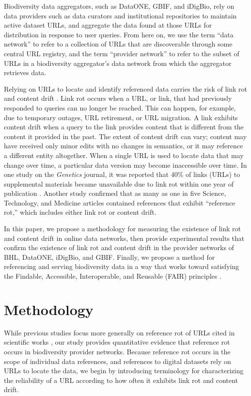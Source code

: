 Biodiversity data aggregators, such as DataONE, GBIF, and iDigBio, rely on data providers such as data curators and institutional repositories to maintain active dataset URLs, and aggregate the data found at those URLs for distribution in response to user queries. From here on, we use the term ``data network'' to refer to a collection of URLs that are discoverable through some central URL registry, and the term ``provider network'' to refer to the subset of URLs in a biodiversity aggregator's data network from which the aggregator retrieves data.

Relying on URLs to locate and identify referenced data carries the risk of link rot and content drift \citep{Klein_2014}. Link rot occurs when a URL, or link, that had previously responded to queries can no longer be reached. This can happen, for example, due to temporary outages, URL retirement, or URL migration. A link exhibits content drift when a query to the link provides content that is different from the content it provided in the past. The extent of content drift can vary; content may have received only minor edits with no changes in semantics, or it may reference a different entity altogether. When a single URL is used to locate data that may change over time, a particular data version may become inaccessible over time. In one study on the \textit{Genetics} journal, it was reported that 40\% of links (URLs) to supplemental materials became unavailable due to link rot within one year of publication \citep{Vision_2010}. Another study \citep{Klein_2014} confirmed that as many as one in five Science, Technology, and Medicine articles contained references that exhibit ``reference rot,'' which includes either link rot or content drift.

In this paper, we propose a methodology for measuring the existence of link rot and content drift in online data networks, then provide experimental results that confirm the existence of link rot and content drift in the provider networks of BHL, DataONE, iDigBio, and GBIF. Finally, we propose a method for referencing and serving biodiversity data in a way that works toward satisfying the Findable, Accessible, Interoperable, and Reusable (FAIR) principles \citep{Wilkinson_2016}.



\section*{Methodology}
While previous studies focus more generally on reference rot of URLs cited in scientific works \citep{Vision_2010,Klein_2014}, our study provides quantitative evidence that reference rot occurs in biodiversity provider networks. Because reference rot occurs in the scope of individual data references, and references to digital datasets rely on URLs to locate the data, we begin by introducing terminology for characterizing the reliability of a URL according to how often it exhibits link rot and content drift.

